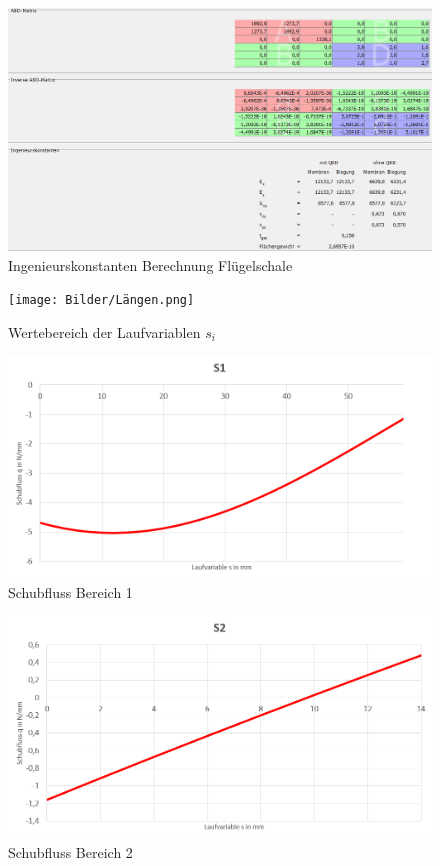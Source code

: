 \begin{figure}[h]
	\includegraphics[width=1.0\textwidth]{Bilder/Konstanten Haut.png}
	\caption{Ingenieurskonstanten Berechnung Flügelschale}
	\label{fig:Ingenieurskonstanten Haut}
\end{figure}
\begin{figure}[h]
	\centering
	\texttt{[image: Bilder/Längen.png]}
	\caption{Wertebereich der Laufvariablen $s_i$}
	\label{fig:LaengenS}
\end{figure}
\begin{figure}[h]
	\includegraphics[width=1.0\textwidth]{Bilder/S1.png}
	\caption{Schubfluss Bereich 1}
	\label{fig:S1}
\end{figure}
\begin{figure}[h]
	\includegraphics[width=1.0\textwidth]{Bilder/S2.png}
	\caption{Schubfluss Bereich 2}
\end{figure}
